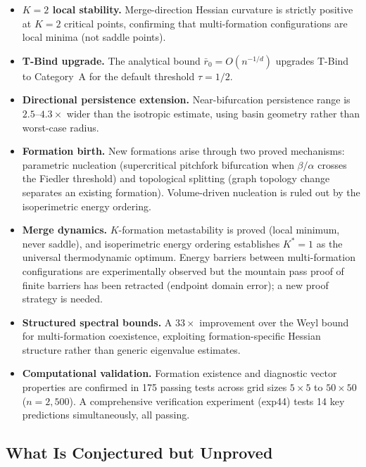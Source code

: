\documentclass[lettersize,journal]{IEEEtran}
\begin{document}
\begin{itemize}
\item \textbf{$K = 2$ local stability.} Merge-direction Hessian curvature is strictly positive at $K = 2$ critical points, confirming that multi-formation configurations are local minima (not saddle points).

\item \textbf{T-Bind upgrade.} The analytical bound $\bar{r}_0 = O(n^{-1/d})$ upgrades T-Bind to Category~A for the default threshold $\tau = 1/2$.

\item \textbf{Directional persistence extension.} Near-bifurcation persistence range is $2.5$--$4.3\times$ wider than the isotropic estimate, using basin geometry rather than worst-case radius.

\item \textbf{Formation birth.} New formations arise through two proved mechanisms: parametric nucleation (supercritical pitchfork bifurcation when $\beta/\alpha$ crosses the Fiedler threshold) and topological splitting (graph topology change separates an existing formation). Volume-driven nucleation is ruled out by the isoperimetric energy ordering.

\item \textbf{Merge dynamics.} $K$-formation metastability is proved (local minimum, never saddle), and isoperimetric energy ordering establishes $K^*=1$ as the universal thermodynamic optimum. Energy barriers between multi-formation configurations are experimentally observed but the mountain pass proof of finite barriers has been retracted (endpoint domain error); a new proof strategy is needed.

\item \textbf{Structured spectral bounds.} A $33\times$ improvement over the Weyl bound for multi-formation coexistence, exploiting formation-specific Hessian structure rather than generic eigenvalue estimates.

\item \textbf{Computational validation.} Formation existence and diagnostic vector properties are confirmed in 175 passing tests across grid sizes $5 \times 5$ to $50 \times 50$ ($n = 2{,}500$). A comprehensive verification experiment (exp44) tests 14 key predictions simultaneously, all passing.
\end{itemize}

\subsection{What Is Conjectured but Unproved}
\end{document}
